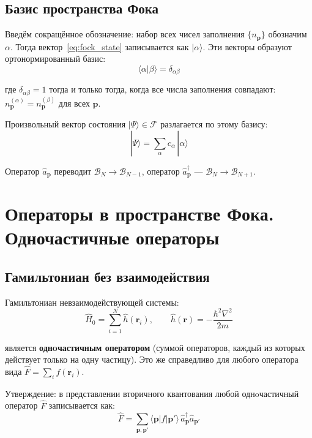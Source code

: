 \documentclass[../general/general]{subfiles}
\begin{document}
\subsection{Базис пространства Фока}

Введём сокращённое обозначение: набор всех чисел заполнения $\{n_\mathbf{p}\}$ обозначим $\alpha$. Тогда вектор~\eqref{eq:fock_state} записывается как $|\alpha\rangle$. Эти векторы образуют ортонормированный базис:
\begin{equation}
    \langle\alpha|\beta\rangle = \delta_{\alpha\beta}
\end{equation}

где $\delta_{\alpha\beta} = 1$ тогда и только тогда, когда все числа заполнения совпадают: $n_\mathbf{p}^{(\alpha)} = n_\mathbf{p}^{(\beta)}$ для всех $\mathbf{p}$.

Произвольный вектор состояния $|\Psi\rangle \in \mathcal{F}$ разлагается по этому базису:
\begin{equation}
    |\Psi\rangle = \sum_\alpha c_\alpha\,|\alpha\rangle
\end{equation}

Оператор $\hat{a}_\mathbf{p}$ переводит $\mathcal{B}_N \to \mathcal{B}_{N-1}$, оператор $\hat{a}^\dagger_\mathbf{p}$ --- $\mathcal{B}_N \to \mathcal{B}_{N+1}$.



\section{Операторы в пространстве Фока. Одночастичные операторы}

\subsection{Гамильтониан без взаимодействия}

Гамильтониан невзаимодействующей системы:
\begin{equation}
    \hat{H}_0 = \sum_{i=1}^N \hat{h}(\mathbf{r}_i), \qquad \hat{h}(\mathbf{r}) = -\frac{\hbar^2\nabla^2}{2m}
\end{equation}

является \textbf{однoчастичным оператором} (суммой операторов, каждый из которых действует только на одну частицу). Это же справедливо для любого оператора вида $\hat{F} = \sum_i f(\mathbf{r}_i)$.

Утверждение: в представлении вторичного квантования любой однoчастичный оператор $\hat{F}$ записывается как:
\begin{equation}
    \boxed{\hat{F} = \sum_{\mathbf{p},\mathbf{p}'} \langle\mathbf{p}|f|\mathbf{p}'\rangle\,\hat{a}^\dagger_\mathbf{p}\hat{a}_{\mathbf{p}'}}
    \label{eq:one_body}
\end{equation}
\end{document}

